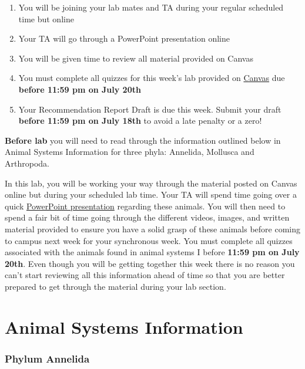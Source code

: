 \documentclass[
]{book}
\providecommand{\tightlist}{%
  \setlength{\itemsep}{0pt}\setlength{\parskip}{0pt}}
\begin{document}
\begin{enumerate}
\def\labelenumi{\arabic{enumi}.}
\tightlist
\item
  You will be joining your lab mates and TA during your regular scheduled time but online
\item
  Your TA will go through a PowerPoint presentation online
\item
  You will be given time to review all material provided on Canvas
\item
  You must complete all quizzes for this week's lab provided on \href{https://canvas.ubc.ca/}{Canvas} due \textbf{before 11:59 pm on July 20th}
\item
  Your Recommendation Report Draft is due this week. Submit your draft \textbf{before 11:59 pm on July 18th} to avoid a late penalty or a zero!
\end{enumerate}

\textbf{Before lab} you will need to read through the information outlined below in Animal Systems Information for three phyla: Annelida, Mollusca and Arthropoda.

In this lab, you will be working your way through the material posted on Canvas online but during your scheduled lab time. Your TA will spend time going over a quick \href{files/Animal_Systems_I_Presentation.pptx}{PowerPoint presentation} regarding these animals. You will then need to spend a fair bit of time going through the different videos, images, and written material provided to ensure you have a solid grasp of these animals before coming to campus next week for your synchronous week. You must complete all quizzes associated with the animals found in animal systems I before \textbf{11:59 pm on July 20th}. Even though you will be getting together this week there is no reason you can't start reviewing all this information ahead of time so that you are better prepared to get through the material during your lab section.

\hypertarget{animal-systems-information}{%
\chapter*{Animal Systems Information}\label{animal-systems-information}}

\hypertarget{phylum-annelida}{%
\subsection*{Phylum Annelida}\label{phylum-annelida}}
\end{document}
